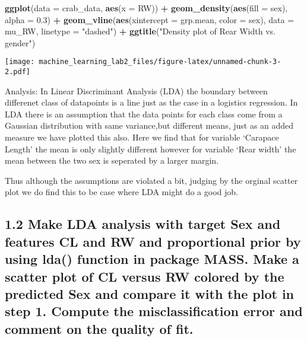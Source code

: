 \documentclass[]{article}
\newenvironment{Shaded}{\begin{snugshade}}{\end{snugshade}}
\newcommand{\KeywordTok}[1]{\textcolor[rgb]{0.13,0.29,0.53}{\textbf{#1}}}
\newcommand{\DataTypeTok}[1]{\textcolor[rgb]{0.13,0.29,0.53}{#1}}
\newcommand{\FloatTok}[1]{\textcolor[rgb]{0.00,0.00,0.81}{#1}}
\newcommand{\StringTok}[1]{\textcolor[rgb]{0.31,0.60,0.02}{#1}}
\newcommand{\OperatorTok}[1]{\textcolor[rgb]{0.81,0.36,0.00}{\textbf{#1}}}
\newcommand{\NormalTok}[1]{#1}
\begin{document}
\begin{Shaded}
\begin{Highlighting}[]
\KeywordTok{ggplot}\NormalTok{(}\DataTypeTok{data =}\NormalTok{ crab_data, }\KeywordTok{aes}\NormalTok{(}\DataTypeTok{x =}\NormalTok{ RW)) }\OperatorTok{+}\StringTok{ }
\StringTok{  }\KeywordTok{geom_density}\NormalTok{(}\KeywordTok{aes}\NormalTok{(}\DataTypeTok{fill =}\NormalTok{ sex), }\DataTypeTok{alpha =} \FloatTok{0.3}\NormalTok{) }\OperatorTok{+}
\StringTok{      }\KeywordTok{geom_vline}\NormalTok{(}\KeywordTok{aes}\NormalTok{(}\DataTypeTok{xintercept =}\NormalTok{ grp.mean, }\DataTypeTok{color =}\NormalTok{ sex),}
             \DataTypeTok{data =}\NormalTok{ mu_RW, }\DataTypeTok{linetype =} \StringTok{"dashed"}\NormalTok{) }\OperatorTok{+}\StringTok{ }
\StringTok{  }\KeywordTok{ggtitle}\NormalTok{(}\StringTok{"Density plot of Rear Width vs. gender"}\NormalTok{)}
\end{Highlighting}
\end{Shaded}

\texttt{[image: machine\_learning\_lab2\_files/figure-latex/unnamed-chunk-3-2.pdf]}

Analysis: In Linear Discriminant Analysis (LDA) the boundary between
differenet class of datapoints is a line just as the case in a logistics
regression. In LDA there is an assumption that the data points for each
class come from a Gaussian distribution with same variance,but different
means, just as an added measure we have plotted this also. Here we find
that for variable `Carapace Length' the mean is only slightly different
however for variable `Rear width' the mean between the two sex is
seperated by a larger margin.

Thus although the assumptions are violated a bit, judging by the orginal
scatter plot we do find this to be case where LDA might do a good job.

\subsection{1.2 Make LDA analysis with target Sex and features CL and RW
and proportional prior by using lda() function in package MASS. Make a
scatter plot of CL versus RW colored by the predicted Sex and compare it
with the plot in step 1. Compute the misclassification error and comment
on the quality of
fit.}\label{make-lda-analysis-with-target-sex-and-features-cl-and-rw-and-proportional-prior-by-using-lda-function-in-package-mass.-make-a-scatter-plot-of-cl-versus-rw-colored-by-the-predicted-sex-and-compare-it-with-the-plot-in-step-1.-compute-the-misclassification-error-and-comment-on-the-quality-of-fit.}
\end{document}
